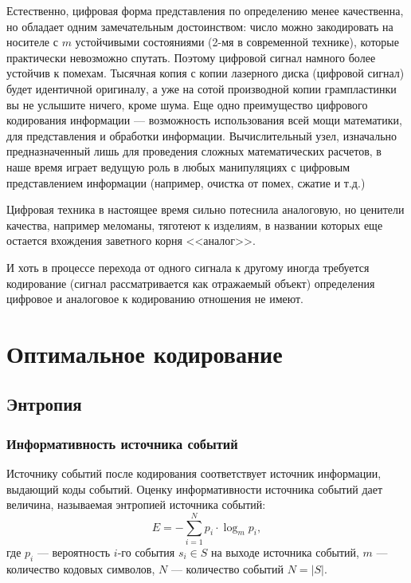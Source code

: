 Естественно, цифровая форма представления по определению менее качественна, но обладает одним замечательным достоинством: число можно закодировать на носителе с $m$ устойчивыми состояниями (2-мя в современной технике), которые практически невозможно спутать. Поэтому цифровой сигнал намного более устойчив к помехам. Тысячная копия с копии лазерного диска (цифровой сигнал) будет идентичной оригиналу, а уже на сотой производной копии грампластинки вы не услышите ничего, кроме шума. Еще одно преимущество цифрового кодирования информации --- возможность использования всей мощи математики, для представления и обработки информации. Вычислительный узел, изначально предназначенный лишь для проведения сложных математических расчетов, в наше время играет ведущую роль в любых манипуляциях с цифровым представлением информации (например, очистка от помех, сжатие и т.д.)

Цифровая техника в настоящее время сильно потеснила аналоговую, но ценители качества, например меломаны, тяготеют к изделиям, в названии которых еще остается вхождения заветного корня <<аналог>>.

И хоть в процессе перехода от одного сигнала к другому иногда требуется кодирование (сигнал рассматривается как отражаемый объект) определения цифровое и аналоговое к кодированию отношения не имеют.


\section{Оптимальное кодирование}


\subsection{Энтропия}

\begin{frame}
    \frametitle{Информативность источника \alert{событий}}
    
    Источнику событий после кодирования соответствует источник информации, выдающий коды событий. Оценку информативности \alert{источника событий} дает величина, называемая \alert{энтропией} источника событий:
    \begin{equation}
        \label{eq:code:entrophyS}
        E=-\sum_{i=1}^N {p_i\cdot\log_m p_i},
    \end{equation}
    где $p_i$ --- вероятность $i$-го события $s_i\in S$ на выходе источника событий, $m$ --- количество кодовых символов, $N$ --- количество событий $N=|S|$.
\end{frame}


